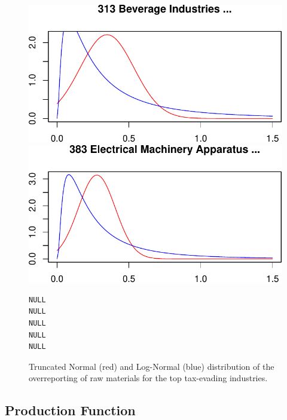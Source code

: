 \documentclass[
  12pt]{article}
\theoremstyle{definition}
\theoremstyle{remark}
\begin{document}
\begin{figure}
\begin{minipage}{\linewidth}
\includegraphics{Tax-Prod_files/figure-pdf/unnamed-chunk-35-4.pdf}

\includegraphics{Tax-Prod_files/figure-pdf/unnamed-chunk-35-5.pdf}

\begin{verbatim}
NULL
NULL
NULL
NULL
NULL
\end{verbatim}

\end{minipage}%

\caption{\label{fig-density-plots}Truncated Normal (red) and Log-Normal
(blue) distribution of the overreporting of raw materials for the top
tax-evading industries.}

\end{figure}%

\subsection{Production Function}\label{production-function}
\end{document}
